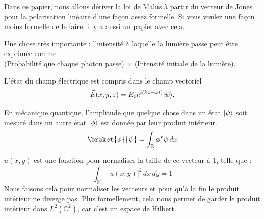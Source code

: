 \documentclass{article}
\begin{document}
\DeclarePairedDelimiter\bra{\langle}{\rvert}
\DeclarePairedDelimiter\ket{\lvert}{\rangle}
\DeclarePairedDelimiterX{}

Dans ce papier, nous allons dériver la loi de Malus à partir du vecteur de Jones pour la polarisation linéaire d'une façon assez formelle. Si vous voulez une façon moins formelle de le faire, il y a aussi un papier avec cela.

Une chose très importante : l'intensité à laquelle la lumière passe peut être exprimée comme \\ (Probabilité que chaque photon passe) $\times$ (Intensité initiale de la lumière).

L'état du champ électrique est compris dans le champ vectoriel 
\[
\vec{E}(x, y, z) = E_0 e^{i(kz- \omega t)} \ket{\psi}.
\]

En mécanique quantique, l'amplitude que quelque chose dans un état $ \ket{\psi} $ soit mesuré dans un autre état $ \ket{\phi} $ est donnée par leur produit intérieur.  
\[
\braket{\phi}{\psi} = \int_{\mathbb{R}} \phi^{*} \psi \, dx
\]

$ u(x, y) $ est une fonction pour normaliser la taille de ce vecteur à 1, telle que :
\[
\int_{\mathbb{R}^2} |u(x, y)|^2 \, dx \, dy = 1
\]
Nous faisons cela pour normaliser les vecteurs et pour qu'à la fin le produit intérieur ne diverge pas. Plus formellement, cela nous permet de garder le produit intérieur dans $ L^2(\mathbb{C}^2) $, car c'est un espace de Hilbert.
\end{document}
